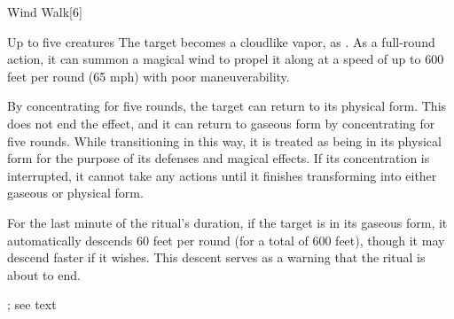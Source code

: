 \begin{spellsection}{Wind Walk}[6]
    \begin{spellheader}
    \end{spellheader}
    \begin{spellcontent}
        \begin{spelltargetinginfo}
        \end{spelltargetinginfo}
        \begin{spelleffects}

            \begin{spelltargets}{Up to five creatures}
                \spelleffect The target becomes a cloudlike vapor, as . As a full-round action, it can summon a magical wind to propel it along at a speed of up to 600 feet per round (65 mph) with poor maneuverability.

                By concentrating for five rounds, the target can return to its physical form. This does not end the effect, and it can return to gaseous form by concentrating for five rounds. While transitioning in this way, it is treated as being in its physical form for the purpose of its defenses and magical effects. If its concentration is interrupted, it cannot take any actions until it finishes transforming into either gaseous or physical form.

                For the last minute of the ritual's duration, if the target is in its gaseous form, it automatically descends 60 feet per round (for a total of 600 feet), though it may descend faster if it wishes. This descent serves as a warning that the ritual is about to end.
            \end{spelltargets}
            \spelldur \durext \dismissable; see text
        \end{spelleffects}
    \end{spellcontent}
    \begin{spellfooter}
    \end{spellfooter}
\end{spellsection}

